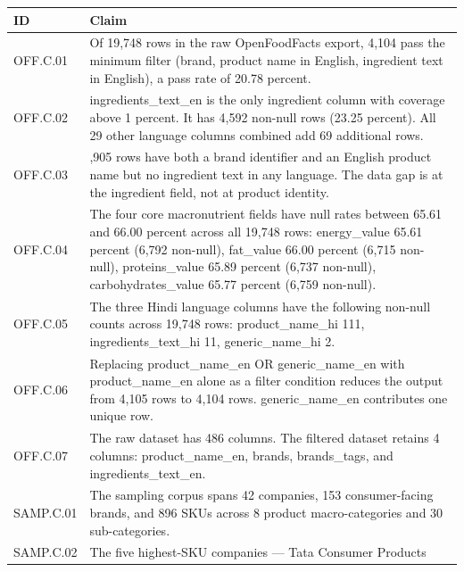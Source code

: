 \documentclass[
  letterpaper,
  DIV=11,
  numbers=noendperiod]{scrartcl}
\newcounter{none} %
\begin{document}
{\def\LTcaptype{none} %
\begin{longtable}[]{@{}
  >{\raggedright\arraybackslash}p{}
  >{\raggedright\arraybackslash}p{}@{}}
\toprule\noalign{}
\begin{minipage}[b]{\linewidth}\raggedright
ID
\end{minipage} & \begin{minipage}[b]{\linewidth}\raggedright
Claim
\end{minipage} \\
\midrule\noalign{}
\endhead
\bottomrule\noalign{}
\endlastfoot
OFF.C.01 & Of 19,748 rows in the raw OpenFoodFacts export, 4,104 pass
the minimum filter (brand, product name in English, ingredient text in
English), a pass rate of 20.78 percent. \\
OFF.C.02 & ingredients\_text\_en is the only ingredient column with
coverage above 1 percent. It has 4,592 non-null rows (23.25 percent).
All 29 other language columns combined add 69 additional rows. \\
OFF.C.03 & 6,905 rows have both a brand identifier and an English
product name but no ingredient text in any language. The data gap is at
the ingredient field, not at product identity. \\
OFF.C.04 & The four core macronutrient fields have null rates between
65.61 and 66.00 percent across all 19,748 rows: energy\_value 65.61
percent (6,792 non-null), fat\_value 66.00 percent (6,715 non-null),
proteins\_value 65.89 percent (6,737 non-null), carbohydrates\_value
65.77 percent (6,759 non-null). \\
OFF.C.05 & The three Hindi language columns have the following non-null
counts across 19,748 rows: product\_name\_hi 111, ingredients\_text\_hi
11, generic\_name\_hi 2. \\
OFF.C.06 & Replacing product\_name\_en OR generic\_name\_en with
product\_name\_en alone as a filter condition reduces the output from
4,105 rows to 4,104 rows. generic\_name\_en contributes one unique
row. \\
OFF.C.07 & The raw dataset has 486 columns. The filtered dataset retains
4 columns: product\_name\_en, brands, brands\_tags, and
ingredients\_text\_en. \\
SAMP.C.01 & The sampling corpus spans 42 companies, 153 consumer-facing
brands, and 896 SKUs across 8 product macro-categories and 30
sub-categories. \\
SAMP.C.02 & The five highest-SKU companies --- Tata Consumer Products

\end{longtable}}
\end{document}
